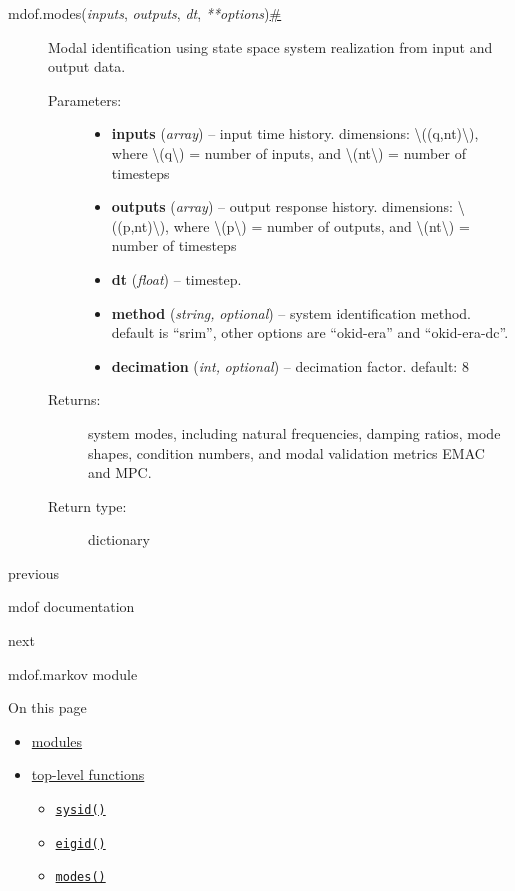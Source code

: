 \begin{description}
\item[{ {{mdof.}}{{modes}}{(}\emph{{{inputs}}}, \emph{{{outputs}}},
\emph{{{dt}}},
\emph{{{**}}{{options}}}{)}\protect\hyperlink{mdof.modes}{\#}}]
Modal identification using state space system realization from input and
output data.

\begin{description}
\item[Parameters{:}]
\begin{itemize}
\item
  \textbf{inputs} (\emph{array}) -- input time history. dimensions:
  {\textbackslash{}((q,nt)\textbackslash{})}, where
  {\textbackslash{}(q\textbackslash{})} = number of inputs, and
  {\textbackslash{}(nt\textbackslash{})} = number of timesteps
\item
  \textbf{outputs} (\emph{array}) -- output response history.
  dimensions: {\textbackslash{}((p,nt)\textbackslash{})}, where
  {\textbackslash{}(p\textbackslash{})} = number of outputs, and
  {\textbackslash{}(nt\textbackslash{})} = number of timesteps
\item
  \textbf{dt} (\emph{float}) -- timestep.
\item
  \textbf{method} (\emph{string,} \emph{optional}) -- system
  identification method. default is ``srim'', other options are
  ``okid-era'' and ``okid-era-dc''.
\item
  \textbf{decimation} (\emph{int,} \emph{optional}) -- decimation
  factor. default: 8
\end{itemize}
\item[Returns{:}]
system modes, including natural frequencies, damping ratios, mode
shapes, condition numbers, and modal validation metrics EMAC and MPC.
\item[Return type{:}]
dictionary
\end{description}
\end{description}

\href{../index.html}{\emph{}}

previous

mdof documentation

\href{mdof.markov.html}{}

next

mdof.markov module

\emph{}

\emph{} On this page

\begin{itemize}
\tightlist
\item
  \protect\hyperlink{modules}{modules}
\item
  \protect\hyperlink{module-mdof}{top-level functions}

  \begin{itemize}
  \tightlist
  \item
    \protect\hyperlink{mdof.sysid}{\texttt{sysid()}}
  \item
    \protect\hyperlink{mdof.eigid}{\texttt{eigid()}}
  \item
    \protect\hyperlink{mdof.modes}{\texttt{modes()}}
  \end{itemize}
\end{itemize}

